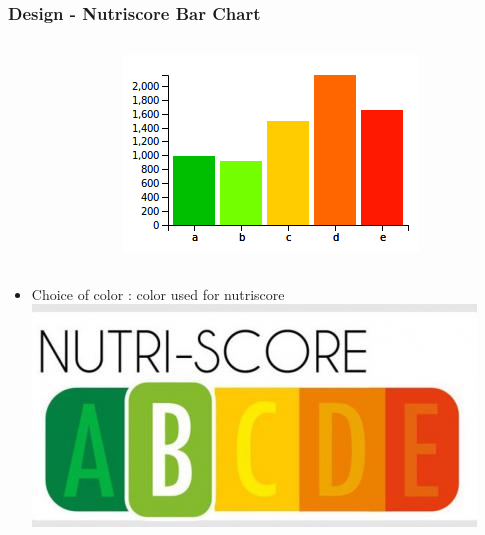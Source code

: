 \documentclass{beamer}
\begin{document}
\begin{frame}
\frametitle{Design - Nutriscore Bar Chart}
\begin{columns}[T]
  \begin{column}{.7\textwidth}
    \begin{table}
    \end{table}
  \end{column}
  \begin{column}{.25\textwidth}
    \begin{figure}
      \centering
      \includegraphics[scale=0.3]{img/nutriscore.png}
    \end{figure}
  \end{column}
\end{columns}
\begin{itemize}
\item Choice of color : color used for nutriscore
\includegraphics[scale=0.2]{img/nutri-score.jpg} 
\end{itemize}
\end{frame}
\end{document}

